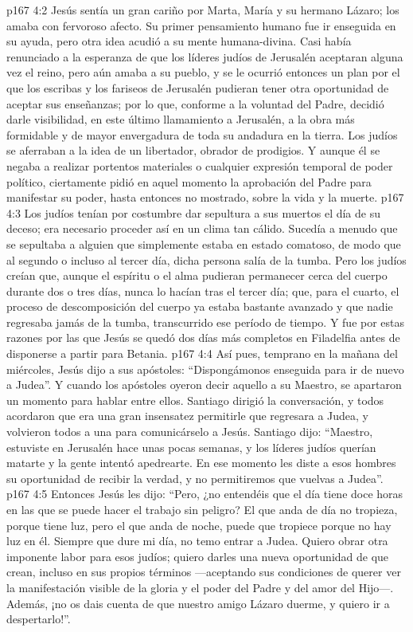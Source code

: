 \vs p167 4:2 \pc Jesús sentía un gran cariño por Marta, María y su hermano Lázaro; los amaba con fervoroso afecto. Su primer pensamiento humano fue ir enseguida en su ayuda, pero otra idea acudió a su mente humana\hyp{}divina. Casi había renunciado a la esperanza de que los líderes judíos de Jerusalén aceptaran alguna vez el reino, pero aún amaba a su pueblo, y se le ocurrió entonces un plan por el que los escribas y los fariseos de Jerusalén pudieran tener otra oportunidad de aceptar sus enseñanzas; por lo que, conforme a la voluntad del Padre, decidió darle visibilidad, en este último llamamiento a Jerusalén, a la obra más formidable y de mayor envergadura de toda su andadura en la tierra. Los judíos se aferraban a la idea de un libertador, obrador de prodigios. Y aunque él se negaba a realizar portentos materiales o cualquier expresión temporal de poder político, ciertamente pidió en aquel momento la aprobación del Padre para manifestar su poder, hasta entonces no mostrado, sobre la vida y la muerte.
\vs p167 4:3 \pc Los judíos tenían por costumbre dar sepultura a sus muertos el día de su deceso; era necesario proceder así en un clima tan cálido. Sucedía a menudo que se sepultaba a alguien que simplemente estaba en estado comatoso, de modo que al segundo o incluso al tercer día, dicha persona salía de la tumba. Pero los judíos creían que, aunque el espíritu o el alma pudieran permanecer cerca del cuerpo durante dos o tres días, nunca lo hacían tras el tercer día; que, para el cuarto, el proceso de descomposición del cuerpo ya estaba bastante avanzado y que nadie regresaba jamás de la tumba, transcurrido ese período de tiempo. Y fue por estas razones por las que Jesús se quedó dos días más completos en Filadelfia antes de disponerse a partir para Betania.
\vs p167 4:4 \pc Así pues, temprano en la mañana del miércoles, Jesús dijo a sus apóstoles: “Dispongámonos enseguida para ir de nuevo a Judea”. Y cuando los apóstoles oyeron decir aquello a su Maestro, se apartaron un momento para hablar entre ellos. Santiago dirigió la conversación, y todos acordaron que era una gran insensatez permitirle que regresara a Judea, y volvieron todos a una para comunicárselo a Jesús. Santiago dijo: “Maestro, estuviste en Jerusalén hace unas pocas semanas, y los líderes judíos querían matarte y la gente intentó apedrearte. En ese momento les diste a esos hombres su oportunidad de recibir la verdad, y no permitiremos que vuelvas a Judea”.
\vs p167 4:5 Entonces Jesús les dijo: “Pero, ¿no entendéis que el día tiene doce horas en las que se puede hacer el trabajo sin peligro? El que anda de día no tropieza, porque tiene luz, pero el que anda de noche, puede que tropiece porque no hay luz en él. Siempre que dure mi día, no temo entrar a Judea. Quiero obrar otra imponente labor para esos judíos; quiero darles una nueva oportunidad de que crean, incluso en sus propios términos ---aceptando sus condiciones de querer ver la manifestación visible de la gloria y el poder del Padre y del amor del Hijo---. Además, ¡no os dais cuenta de que nuestro amigo Lázaro duerme, y quiero ir a despertarlo!”.
